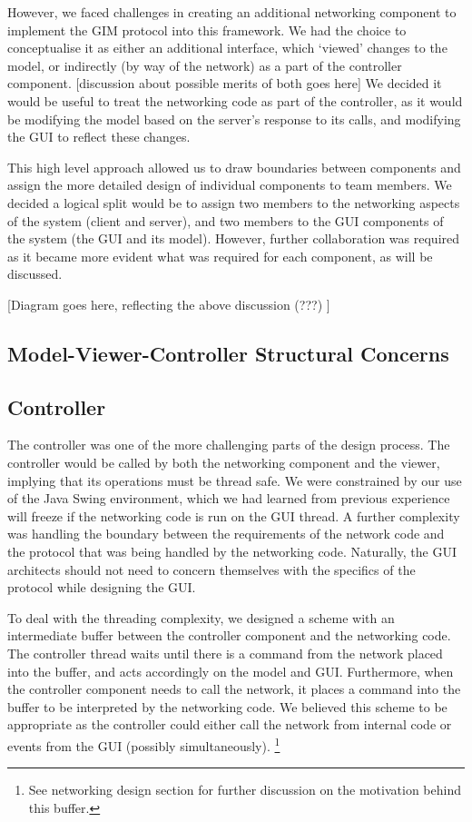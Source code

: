 However, we faced challenges in creating an additional networking component to implement the GIM protocol into this framework. We had the choice to conceptualise it as either an additional interface, which `viewed' changes to the model, or indirectly (by way of the network) as a part of the controller component. [discussion about possible merits of both goes here] We decided it would be useful to treat the networking code as part of the controller, as it would be modifying the model based on the server's response to its calls, and modifying the GUI to reflect these changes.
	
This high level approach allowed us to draw boundaries between components and assign the more detailed design of individual components to team members. We decided a logical split would be to assign two members to the networking aspects of the system (client and server), and two members to the GUI components of the system (the GUI and its model). However, further collaboration was required as it became more evident what was required for each component, as will be discussed.

[Diagram goes here, reflecting the above discussion (???) ]

\subsection {Model-Viewer-Controller Structural Concerns}

\subsection {Controller}

The controller was one of the more challenging parts of the design process. The controller would be called by both the networking component and the viewer, implying that its operations must be thread safe. We were constrained by our use of the Java Swing environment, which we had learned from previous experience will freeze if the networking code is run on the GUI thread. A further complexity was handling the boundary between the requirements of the network code and the protocol that was being handled by the networking code. Naturally, the GUI architects should not need to concern themselves with the specifics of the protocol while designing the GUI. 

To deal with the threading complexity, we designed a scheme with an intermediate buffer between the controller component and the networking code. The controller thread waits until there is a command from the network placed into the buffer, and acts accordingly on the model and GUI. Furthermore, when the controller component needs to call the network, it places a command into the buffer to be interpreted by the networking code. We believed this scheme to be appropriate as the controller could either call the network from internal code or events from the GUI (possibly simultaneously). \footnote{See networking design section for further discussion on the motivation behind this buffer.}

